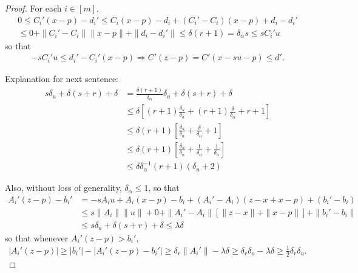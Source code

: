 \begin{proof}
For each $i \in [m]$,
\begin{align*}
0 \le C_i'(x-p) - d_i'
\le C_i(x - p) - d_i + (C_i' - C_i)(x-p) + d_i - d_i'  \\
\le 0 + \|C_i' - C_i\| \|x - p\| + \|d_i - d_i'\| 
\le \delta (r+1)
= \delta_{\alpha} s \le sC_i'u
\end{align*}
so that
\begin{align}
-sC_i'u \le d_i' - C_i'(x - p) \Longrightarrow C'(z - p) = C'(x - su - p) \le d'. \label{reun_eqn3}
\end{align}

\begin{boxedcomment}
Explanation for next sentence:
\begin{align*}
s\delta_u + \delta \left(s + r\right) + \delta 
&= \frac{\delta(r + 1)}{\delta_{\alpha}}\delta_u + \delta \left(s + r\right) + \delta \\
&\le \delta \left[(r + 1)\frac{\delta_u}{\delta_{\alpha}} + (r+1)\frac{\delta}{\delta_{\alpha}} + r + 1\right] \\
&\le \delta (r + 1) \left[\frac{\delta_u}{\delta_{\alpha}} + \frac{\delta}{\delta_{\alpha}} + 1\right] \\
&\le \delta (r + 1) \left[\frac{\delta_u}{\delta_{\alpha}} + \frac{1}{\delta_{\alpha}} + \frac{1}{\delta_{\alpha}}\right] \\
&\le \delta \delta_{\alpha}^{-1}(r + 1) (\delta_u + 2)
\end{align*}
\end{boxedcomment}
Also, without loss of generality, $\delta_{\alpha} \le 1$, so that
\begin{align}
A_i'(z - p) - b_i' 
&= - s A_iu + A_i(x - p) - b_i + (A_i' - A_i)(z - x + x - p) + (b_i' - b_i) \nonumber \\
&\le s \|A_i\|\|u\| + 0 + \|A_i' - A_i\|\left[\|z - x\| + \|x - p\|\right] + \|b_i'-b_i\| \nonumber \\
&\le s\delta_u + \delta \left(s + r\right) + \delta \le \lambda \delta \label{reun_eqn1}
\end{align}
so that whenever $A_i'(z - p) > b_i'$,
\begin{align}
\left|A_i'(z - p)\right| 
\ge |b_i'| - \left| A_i'(z - p) - b_i'\right| 
\ge \delta_r\|A_i'\| - \lambda \delta 
\ge \delta_r \delta_u - \lambda \delta \ge \frac 1 2 \delta_r \delta_u. \label{reun_eqn2}
\end{align}



\end{proof}
